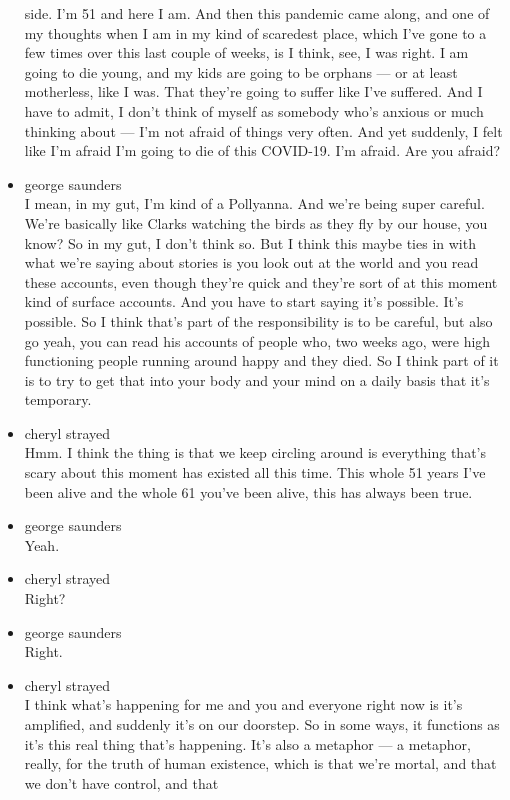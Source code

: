 \begin{itemize}
  side. I'm 51 and here I am. And then this pandemic came along, and one
  of my thoughts when I am in my kind of scaredest place, which I've
  gone to a few times over this last couple of weeks, is I think, see, I
  was right. I am going to die young, and my kids are going to be
  orphans --- or at least motherless, like I was. That they're going to
  suffer like I've suffered. And I have to admit, I don't think of
  myself as somebody who's anxious or much thinking about --- I'm not
  afraid of things very often. And yet suddenly, I felt like I'm afraid
  I'm going to die of this COVID-19. I'm afraid. Are you afraid?
\item
  george saunders\\
  I mean, in my gut, I'm kind of a Pollyanna. And we're being super
  careful. We're basically like Clarks watching the birds as they fly by
  our house, you know? So in my gut, I don't think so. But I think this
  maybe ties in with what we're saying about stories is you look out at
  the world and you read these accounts, even though they're quick and
  they're sort of at this moment kind of surface accounts. And you have
  to start saying it's possible. It's possible. So I think that's part
  of the responsibility is to be careful, but also go yeah, you can read
  his accounts of people who, two weeks ago, were high functioning
  people running around happy and they died. So I think part of it is to
  try to get that into your body and your mind on a daily basis that
  it's temporary.
\item
  cheryl strayed\\
  Hmm. I think the thing is that we keep circling around is everything
  that's scary about this moment has existed all this time. This whole
  51 years I've been alive and the whole 61 you've been alive, this has
  always been true.
\item
  george saunders\\
  Yeah.
\item
  cheryl strayed\\
  Right?
\item
  george saunders\\
  Right.
\item
  cheryl strayed\\
  I think what's happening for me and you and everyone right now is it's
  amplified, and suddenly it's on our doorstep. So in some ways, it
  functions as it's this real thing that's happening. It's also a
  metaphor --- a metaphor, really, for the truth of human existence,
  which is that we're mortal, and that we don't have control, and that

\end{itemize}

